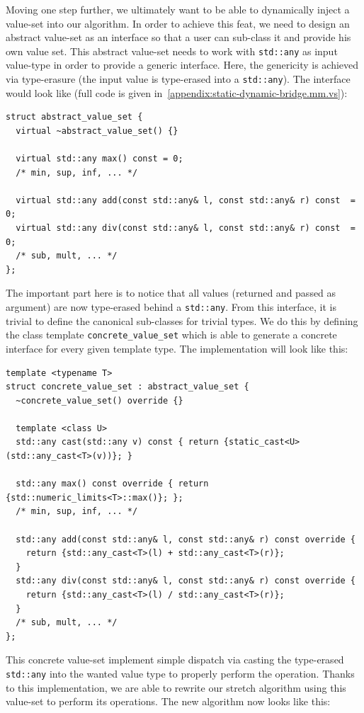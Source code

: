Moving one step further, we ultimately want to be able to dynamically inject a value-set into our algorithm. In order to
achieve this feat, we need to design an abstract value-set as an interface so that a user can sub-class it and provide
his own value set. This abstract value-set needs to work with \texttt{std::any} as input value-type in order to provide
a generic interface. Here, the genericity is achieved via type-erasure (the input value is type-erased into a
\texttt{std::any}). The interface would look like (full code is given in~\cref{appendix:static-dynamic-bridge.mm.vs}):
\begin{verbatim}
struct abstract_value_set {
  virtual ~abstract_value_set() {}

  virtual std::any max() const = 0;
  /* min, sup, inf, ... */

  virtual std::any add(const std::any& l, const std::any& r) const  = 0;
  virtual std::any div(const std::any& l, const std::any& r) const  = 0;
  /* sub, mult, ... */
};
\end{verbatim}
The important part here is to notice that all values (returned and passed as argument) are now type-erased behind a
\texttt{std::any}. From this interface, it is trivial to define the canonical sub-classes for trivial types. We do this
by defining the class template \texttt{concrete\_value\_set} which is able to generate a concrete interface for every
given template type. The implementation will look like this:
\begin{verbatim}
template <typename T>
struct concrete_value_set : abstract_value_set {
  ~concrete_value_set() override {}

  template <class U>
  std::any cast(std::any v) const { return {static_cast<U>(std::any_cast<T>(v))}; }

  std::any max() const override { return {std::numeric_limits<T>::max()}; };
  /* min, sup, inf, ... */

  std::any add(const std::any& l, const std::any& r) const override {
    return {std::any_cast<T>(l) + std::any_cast<T>(r)};
  }
  std::any div(const std::any& l, const std::any& r) const override {
    return {std::any_cast<T>(l) / std::any_cast<T>(r)};
  }
  /* sub, mult, ... */
};
\end{verbatim}
This concrete value-set implement simple dispatch via casting the type-erased \texttt{std::any} into the wanted value
type to properly perform the operation. Thanks to this implementation, we are able to rewrite our stretch algorithm
using this value-set to perform its operations. The new algorithm now looks like this:
